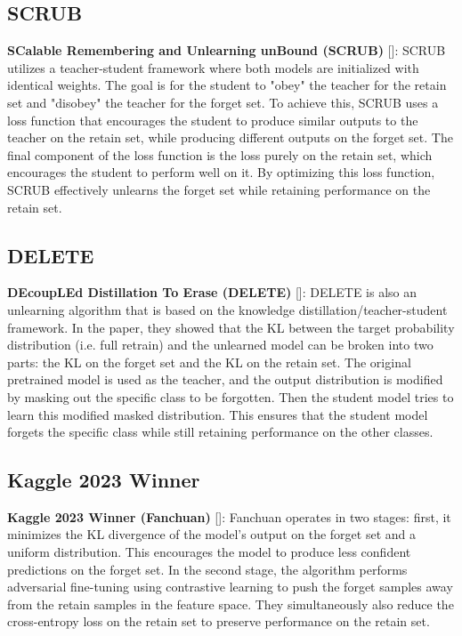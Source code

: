 \documentclass{article}
\begin{document}
\subsection{SCRUB}
\textbf{SCalable Remembering and Unlearning unBound (SCRUB)} [\cite{kurmanji2023unboundedmachineunlearning}]: SCRUB utilizes a teacher-student framework where both models are initialized with identical weights. The goal is for the student to "obey" the teacher for the retain set and "disobey" the teacher for the forget set. 
To achieve this, SCRUB uses a loss function that encourages the student to produce similar outputs to the teacher on the retain set, while producing different outputs on the forget set. The final component of the loss function is the loss purely on the retain set, which encourages the student to perform well on it. By optimizing this loss function, SCRUB effectively unlearns the forget set while retaining performance on the retain set.

\subsection{DELETE}
\textbf{DEcoupLEd Distillation To Erase (DELETE)} [\cite{zhou2025decoupleddistillationerasegeneral}]: DELETE is also an unlearning algorithm that is based on the knowledge distillation/teacher-student framework. In the paper, they showed that the KL between the target probability distribution (i.e. full retrain) and the unlearned model can be broken into two parts: the KL on the forget set and the KL on the retain set. The original pretrained model is used as the teacher, and the output distribution is modified by masking out the specific class to be forgotten. Then the student model tries to learn this modified masked distribution. 
This ensures that the student model forgets the specific class while still retaining performance on the other classes. 

 
\subsection{Kaggle 2023 Winner}
\textbf{Kaggle 2023 Winner (Fanchuan)} [\cite{2023-winner}]: Fanchuan operates in two stages: first, it minimizes the KL divergence of the model's output on the forget set and a uniform distribution. This encourages the model to produce less confident predictions on the forget set. In the second stage, the algorithm performs adversarial fine-tuning using contrastive learning to push the forget samples away from the retain samples in the feature space. They simultaneously also reduce the cross-entropy loss on the retain set to preserve performance on the retain set. 
\end{document}
